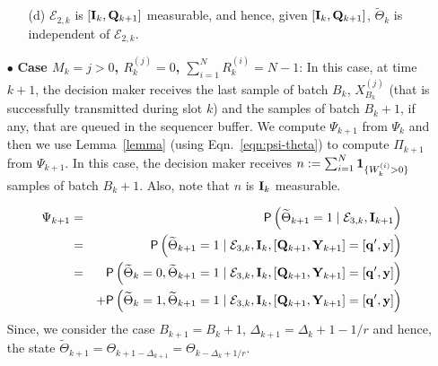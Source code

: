 \documentclass[acmtosn]{acmtrans2m}
\newcommand{\prob}[1]{\mathsf{P}\left(#1\right)}
\begin{document}
\begin{itemize}
\begin{itemize}
\item[(d)]  ${\mathcal E}_{2,k}$ is $[{\bf I}_{k}, {\bf Q}_{k+1}]$
measurable, and hence, given  $[{\bf I}_{k}, {\bf Q}_{k+1}]$, 
$\widetilde\Theta_k$ is independent of ${\mathcal E}_{2,k}$.
\end{itemize}

\item[$\bullet$] {\bf Case $M_k = j>0$, $R_k^{(j)} = 0$,
$\sum_{i=1}^NR_k^{(i)} = N-1$}:
In this case, at time $k+1$, the decision maker receives the last sample
of batch $B_k$, $X_{B_k}^{(j)}$ (that is successfully transmitted during
slot $k$) and the samples of batch $B_k+1$, if any, that are queued in
the sequencer buffer. We compute $\Psi_{k+1}$ from $\Psi_k$ and then we
use Lemma~\ref{lemma} (using Eqn.~\ref{eqn:psi-theta}) to compute
$\Pi_{k+1}$ from $\Psi_{k+1}$. In this case, the decision maker 
receives $n := \sum_{i=1}^N {\bf 1}_{\{W_k^{(i)}>0\}}$ samples of batch
$B_k+1$. Also, note that $n$ is ${\bf I}_k$ measurable.

\begin{eqnarray*}
 \Psi_{k+1}
& = & \prob{\widetilde\Theta_{k+1}=1\mid {\mathcal E}_{3,k}, {\bf I}_{k+1}} \\ 
& = & \prob{\widetilde\Theta_{k+1}=1\mid {\mathcal E}_{3,k}, {\bf
I}_{k}, [{\mathbf Q}_{k+1}, {\bf Y}_{k+1}]=[{\bf q}',{\bf y}]} \\ 
& = & \prob{\widetilde\Theta_k = 0, \widetilde\Theta_{k+1}=1\mid {\mathcal E}_{3,k}, {\bf
I}_{k}, [{\mathbf Q}_{k+1}, {\bf Y}_{k+1}]=[{\bf q}',{\bf y}]}\\
& & 
+ \prob{\widetilde\Theta_k = 1, \widetilde\Theta_{k+1}=1\mid {\mathcal E}_{3,k}, {\bf
I}_{k}, [{\mathbf Q}_{k+1}, {\bf Y}_{k+1}]=[{\bf q}',{\bf y}]}
\end{eqnarray*}
Since, we consider the case $B_{k+1}=B_k+1$, $\Delta_{k+1} =
\Delta_k+1-1/r$ and hence, the state $\widetilde\Theta_{k+1} =
\Theta_{k+1-\Delta_{k+1}} = \Theta_{k-\Delta_k+1/r}$.


\end{itemize}
\end{document}
